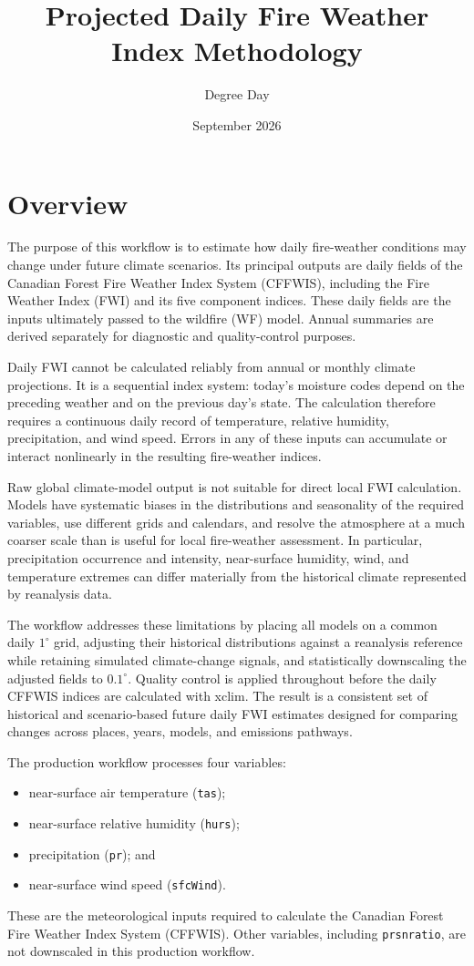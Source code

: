 \documentclass[11pt]{article}
\title{Projected Daily Fire Weather Index Methodology}
\author{Degree Day}
\date{September 2026}
\begin{document}
\maketitle

\section{Overview}

The purpose of this workflow is to estimate how daily fire-weather conditions
may change under future climate scenarios. Its principal outputs are daily
fields of the Canadian Forest Fire Weather Index System (CFFWIS), including the
Fire Weather Index (FWI) and its five component indices. These daily fields are
the inputs ultimately passed to the wildfire (WF) model. Annual summaries are
derived separately for diagnostic and quality-control purposes.

Daily FWI cannot be calculated reliably from annual or monthly climate
projections. It is a sequential index system: today's moisture codes depend on
the preceding weather and on the previous day's state. The calculation therefore
requires a continuous daily record of temperature, relative humidity,
precipitation, and wind speed. Errors in any of these inputs can accumulate or
interact nonlinearly in the resulting fire-weather indices.

Raw global climate-model output is not suitable for direct local FWI
calculation. Models have systematic biases in the distributions and seasonality
of the required variables, use different grids and calendars, and resolve the
atmosphere at a much coarser scale than is useful for local fire-weather
assessment. In particular, precipitation occurrence and intensity, near-surface
humidity, wind, and temperature extremes can differ materially from the
historical climate represented by reanalysis data.

The workflow addresses these limitations by placing all models on a common
daily $1^{\circ}$ grid, adjusting their historical distributions against a
reanalysis reference while retaining simulated climate-change signals, and
statistically downscaling the adjusted fields to $0.1^{\circ}$. Quality control
is applied throughout before the daily CFFWIS indices are calculated with
xclim. The result is a consistent set of historical and scenario-based future
daily FWI estimates designed for comparing changes across places, years,
models, and emissions pathways.

The production workflow processes four variables:
\begin{itemize}
  \item near-surface air temperature (\texttt{tas});
  \item near-surface relative humidity (\texttt{hurs});
  \item precipitation (\texttt{pr}); and
  \item near-surface wind speed (\texttt{sfcWind}).
\end{itemize}
These are the meteorological inputs required to calculate the Canadian Forest
Fire Weather Index System (CFFWIS). Other variables, including
\texttt{prsnratio}, are not downscaled in this production workflow.
\end{document}
